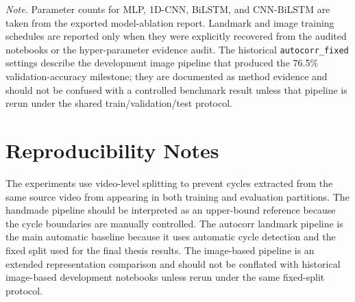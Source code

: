 \begin{table}[htbp]
\vspace{0.5em}
\footnotesize
\noindent\textit{Note.} Parameter counts for MLP, 1D-CNN, BiLSTM, and
CNN-BiLSTM are taken from the exported model-ablation report. Landmark and image
training schedules are reported only when they were explicitly recovered from
the audited notebooks or the hyper-parameter evidence audit. The historical
\texttt{autocorr\_fixed} settings describe the development image pipeline that
produced the 76.5\% validation-accuracy milestone; they are documented as method
evidence and should not be confused with a controlled benchmark result unless
that pipeline is rerun under the shared train/validation/test protocol.
\end{table}

\section{Reproducibility Notes}
\label{app:reproducibility-notes}

The experiments use video-level splitting to prevent cycles extracted from the
same source video from appearing in both training and evaluation partitions.
The handmade pipeline should be interpreted as an upper-bound reference because
the cycle boundaries are manually controlled. The autocorr landmark pipeline is
the main automatic baseline because it uses automatic cycle detection and the
fixed split used for the final thesis results. The image-based pipeline is an
extended representation comparison and should not be conflated with historical
image-based development notebooks unless rerun under the same fixed-split
protocol.

